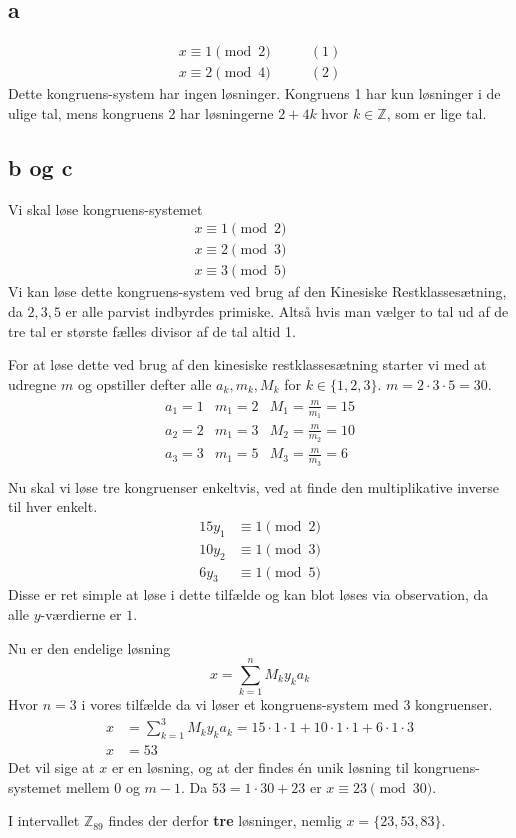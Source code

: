\documentclass[a4paper,10pt]{article}
\newcommand{\Z}{\mathbb{Z}}
\begin{document}
\subsection{a}
\begin{align*}
    x \equiv 1 \pmod 2 & \qquad (1) \\
    x \equiv 2 \pmod 4 & \qquad (2)
\end{align*}
Dette kongruens-system har ingen løsninger. Kongruens 1 har kun løsninger i de
ulige tal, mens kongruens 2 har løsningerne $2 + 4k$ hvor $k \in \Z$, som er
lige tal.

\subsection{b og c}
Vi skal løse kongruens-systemet 
\begin{align*}
    x \equiv 1 \pmod 2 & \qquad \\  
    x \equiv 2 \pmod 3 & \qquad \\  
    x \equiv 3 \pmod 5 & \qquad 
\end{align*}
Vi kan løse dette kongruens-system ved brug af den Kinesiske
Restklassesætning, da $2, 3, 5$ er alle parvist indbyrdes primiske. Altså hvis
man vælger to tal ud af de tre tal er største fælles divisor af de tal altid
1.

For at løse dette ved brug af den kinesiske restklassesætning starter vi med
at udregne $m$ og opstiller defter alle $a_k, m_k, M_k$ for $k \in
\{1,2,3\}$. $m = 2 \cdot 3 \cdot 5 = 30$.
\begin{align*}
\begin{matrix}
    a_1 = 1 & m_1 = 2 & M_1 = \frac{m}{m_1} = 15 \\
    a_2 = 2 & m_1 = 3 & M_2 = \frac{m}{m_2} = 10 \\
    a_3 = 3 & m_1 = 5 & M_3 = \frac{m}{m_3} = 6 \\
\end{matrix}
\end{align*}
Nu skal vi løse tre kongruenser enkeltvis, ved at finde den multiplikative
inverse til hver enkelt.
\begin{align*}
    15y_1 &\equiv 1 \pmod 2 \\
    10y_2 &\equiv 1 \pmod 3 \\
    6y_3  &\equiv 1 \pmod 5 
\end{align*}
Disse er ret simple at løse i dette tilfælde og kan blot løses via
observation, da alle $y$-værdierne er $1$.

Nu er den endelige løsning 
\[
    x = \sum_{k = 1}^{n} M_k y_k a_k
\]
Hvor $n = 3$ i vores tilfælde da vi løser et kongruens-system med 3
kongruenser. 
\begin{align*}
    x &= \sum_{k = 1}^{3} M_k y_k a_k = 
        15 \cdot 1 \cdot 1 + 10 \cdot 1 \cdot 1 + 6 \cdot 1 \cdot 3 \\
    x &= 53
\end{align*}
Det vil sige at $x$ er en løsning, og at der findes én unik løsning til
kongruens-systemet mellem $0$ og $m - 1$. 
Da $53 = 1\cdot 30 + 23$ er $x \equiv 23 \pmod{30}$.

I intervallet $\Z_{89}$ findes der derfor \textbf{tre} løsninger,
nemlig $x = \{23, 53, 83\}$.
\end{document}
